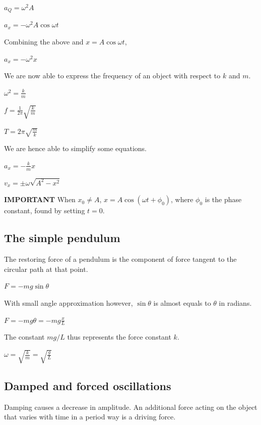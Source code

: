 \documentclass[a4paper]{article}
\begin{document}
\begin{center}
$a_{Q} = \omega^{2} A$
\end{center}

\begin{center}
$a_{x} = -\omega^{2} A\cos{\omega t}$
\end{center}
Combining the above and $x = A\cos{\omega t}$,
\begin{center}
$a_{x} = -\omega^{2}x$
\end{center}
We are now able to express the frequency of an object with respect to $k$ and $m$.
\begin{center}
$\omega^{2} = \displaystyle\frac{k}{m}$
\end{center}
\begin{center}
$f = \displaystyle\frac{1}{2\pi}\sqrt{\frac{k}{m}}$
\end{center}
\begin{center}
$T = 2\pi\sqrt{\displaystyle\frac{m}{k}}$
\end{center}
We are hence able to simplify some equations.  
\begin{center}
$a_{x} = -\displaystyle\frac{k}{m} x$
\end{center}
\begin{center}
$v_{x} = \displaystyle\pm\omega\sqrt{A^{2}-x^{2}}$
\end{center}
\textbf{IMPORTANT} When $x_{0} \ne A$, $x = A\cos{(\omega t+\phi_{0})}$, where $\phi_{0}$ is the phase constant, found by setting $t = 0$. 
\subsection{The simple pendulum}
The restoring force of a pendulum is the component of force tangent to the circular path at that point.
\begin{center}
$F = -mg\sin{\theta}$
\end{center}
With small angle approximation however, $\sin{\theta}$ is almost equals to $\theta$ in radians.
\begin{center}
$ \displaystyle F = -mg\theta = -mg\frac{x}{L}$
\end{center}
The constant $mg/L$ thus represents the force constant $k$.
\begin{center}
$\omega = \displaystyle\sqrt{\frac{k}{m}} = \sqrt{\frac{g}{L}}$
\end{center}
\subsection{Damped and forced oscillations}
Damping causes a decrease in amplitude. An additional force acting on the object that varies with time in a period way is a driving force. 
\end{document}
